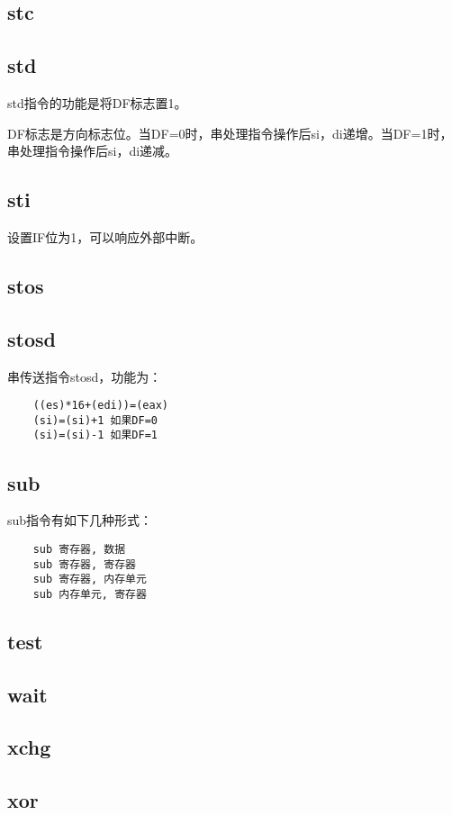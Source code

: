 \documentclass[a4paper,left=2.5cm,right=2.5cm,11pt]{article}
\begin{document}
\subsection{stc}
\subsection{std}
	std指令的功能是将DF标志置1。\par
	DF标志是方向标志位。当DF=0时，串处理指令操作后si，di递增。当DF=1时，串处理指令操作后si，di递减。

\subsection{sti}
	设置IF位为1，可以响应外部中断。

\subsection{stos}
\subsection{stosd}
	串传送指令stosd，功能为：
	\begin{lstlisting}
	((es)*16+(edi))=(eax)
	(si)=(si)+1 如果DF=0
	(si)=(si)-1 如果DF=1
	\end{lstlisting}

\subsection{sub}
	sub指令有如下几种形式：
	\begin{lstlisting}
	sub 寄存器, 数据
	sub 寄存器, 寄存器
	sub 寄存器, 内存单元
	sub 内存单元, 寄存器
	\end{lstlisting}
	
\subsection{test}
\subsection{wait}
\subsection{xchg}
\subsection{xor}
\end{document}
